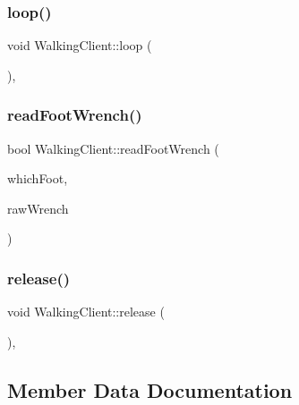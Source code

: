 \subsubsection{\texorpdfstring{loop()}{loop()}}
{\footnotesize\ttfamily void Walking\+Client\+::loop (\begin{DoxyParamCaption}{ }\end{DoxyParamCaption})\hspace{0.3cm}{\ttfamily [protected]}, {\ttfamily [virtual]}}

\hypertarget{classWalkingClient_a03ea2313c954a97aeb4d5b614f3e6caa}{}\label{classWalkingClient_a03ea2313c954a97aeb4d5b614f3e6caa} 
\subsubsection{\texorpdfstring{read\+Foot\+Wrench()}{readFootWrench()}}
{\footnotesize\ttfamily bool Walking\+Client\+::read\+Foot\+Wrench (\begin{DoxyParamCaption}\item[{\hyperlink{ZmpController_8h_a4b6a8e135f90bd56e5a57a60efb42529}{F\+O\+OT}}]{which\+Foot,  }\item[{Eigen\+::\+Vector\+Xd \&}]{raw\+Wrench }\end{DoxyParamCaption})}

\hypertarget{classWalkingClient_a3b36da9d7649865a13c9318dd73ebc7e}{}\label{classWalkingClient_a3b36da9d7649865a13c9318dd73ebc7e} 
\subsubsection{\texorpdfstring{release()}{release()}}
{\footnotesize\ttfamily void Walking\+Client\+::release (\begin{DoxyParamCaption}{ }\end{DoxyParamCaption})\hspace{0.3cm}{\ttfamily [protected]}, {\ttfamily [virtual]}}



\subsection{Member Data Documentation}
\hypertarget{classWalkingClient_af1d2fec39a0545daf5d5e3681b4b2f17}{}\label{classWalkingClient_af1d2fec39a0545daf5d5e3681b4b2f17} 
